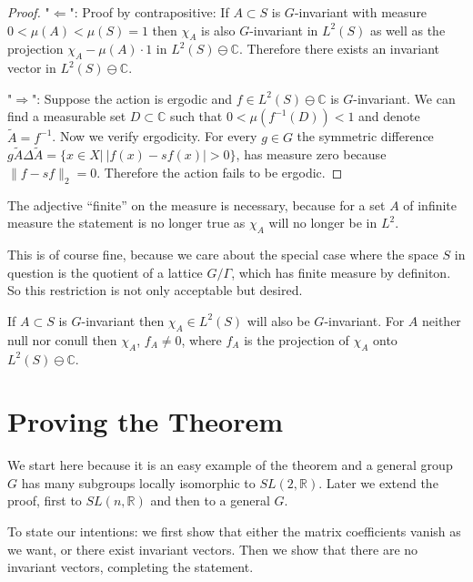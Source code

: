 \documentclass[
  12pt
]{article}
\theoremstyle{plain}
\newtheorem*{proof}{Proof}
\begin{document}
  \begin{proof}

    "$\Leftarrow$": Proof by contrapositive:
    If $A\subset S$ is $G$-invariant
    with measure $0 < \mu(A) < \mu(S) = 1$ then $\chi_A$ is also $G$-invariant
    in $L^2(S)$ as well as the projection $\chi_A - \mu(A)\cdot 1$ in
    $L^2(S)\ominus \mathbb{C}$. Therefore there exists an invariant vector in
    $L^2(S)\ominus \mathbb{C}$.

    "$\Rightarrow$": \cite[Prop 2.7]{Kerr16}
    Suppose the action is ergodic and $f\in L^2(S)\ominus \mathbb{C}$ is
    $G$-invariant. We can find a measurable set $D\subset \mathbb{C}$ such that
    $0<\mu(f^{-1}(D)) < 1$ and denote $\widetilde{A} = f^{-1}$. Now we verify
    ergodicity. For every $g\in G$ the symmetric difference
    $g\widetilde{A} \Delta \widetilde{A} = \{x \in X | \ |f(x)-sf(x)| > 0\}$,
    has measure zero because $\|f - sf\|_2=0$.
    Therefore the action fails to be ergodic.
  \end{proof}

  The adjective ``finite'' on the measure is necessary, because for a set
  $A$ of infinite measure the statement is no longer true as $\chi_A$
  will no longer be in $L^2$.

  This is of course fine, because we care about the special case where the
  space $S$ in question is the quotient of a lattice $G/\Gamma$, which has
  finite measure by definiton. So this restriction is not only acceptable but
  desired.

  If $A\subset S$ is $G$-invariant then $\chi_A\in L^2(S)$ will also
  be $G$-invariant. 
  For $A$ neither null nor conull then
  $\chi_A$, $f_A \neq 0$, where $f_A$ is the projection of
  $\chi_A$ onto $L^2(S) \ominus \mathbb{C}$.




\hypertarget{proof-for-sl2r}{%
\section{Proving the Theorem}\label{proof-for-sl2r}}


  We start here because it is an easy example of the theorem and a general
  group $G$ has many subgroups locally isomorphic to
  $SL(2, \mathbb{R})$. Later we extend the proof, first to
  $SL(n, \mathbb{R})$ and then to a general $G$.

  To state our intentions: we first show that either the matrix
  coefficients vanish as we want, or there exist invariant vectors. Then
  we show that there are no invariant vectors, completing the statement.
\end{document}
